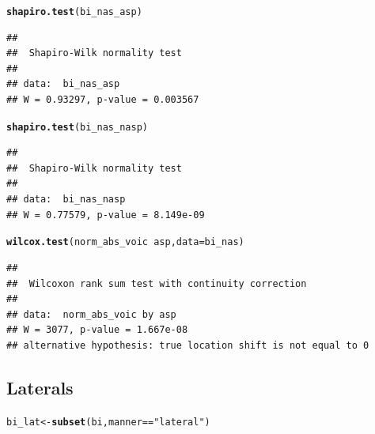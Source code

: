 \documentclass[a4paper,11pt]{article}\usepackage[]{graphicx}\usepackage[]{color}
\makeatletter
\newcommand{\hlstr}[1]{\textcolor[rgb]{0.192,0.494,0.8}{#1}}%
\newcommand{\hlopt}[1]{\textcolor[rgb]{0,0,0}{#1}}%
\newcommand{\hlstd}[1]{\textcolor[rgb]{0.345,0.345,0.345}{#1}}%
\newcommand{\hlkwb}[1]{\textcolor[rgb]{0.69,0.353,0.396}{#1}}%
\newcommand{\hlkwc}[1]{\textcolor[rgb]{0.333,0.667,0.333}{#1}}%
\newcommand{\hlkwd}[1]{\textcolor[rgb]{0.737,0.353,0.396}{\textbf{#1}}}%
\newenvironment{kframe}{%
 \def\at@end@of@kframe{}%
 \ifinner\ifhmode%
  \def\at@end@of@kframe{\end{minipage}}%
  \begin{minipage}{\columnwidth}%
 \fi\fi%
 \def\FrameCommand##1{\hskip\@totalleftmargin \hskip-\fboxsep
 \colorbox{shadecolor}{##1}\hskip-\fboxsep
     \hskip-\linewidth \hskip-\@totalleftmargin \hskip\columnwidth}%
 \MakeFramed {\advance\hsize-\width
   \@totalleftmargin\z@ \linewidth\hsize
   \@setminipage}}%
 {\par\unskip\endMakeFramed%
 \at@end@of@kframe}
\newenvironment{knitrout}{}{} %
\makeatother
\begin{document}
\begin{knitrout}
\color{fgcolor}\begin{kframe}
\begin{alltt}
\hlkwd{shapiro.test}\hlstd{(bi_nas_asp)}
\end{alltt}
\begin{verbatim}
## 
## 	Shapiro-Wilk normality test
## 
## data:  bi_nas_asp
## W = 0.93297, p-value = 0.003567
\end{verbatim}
\begin{alltt}
\hlkwd{shapiro.test}\hlstd{(bi_nas_nasp)}
\end{alltt}
\begin{verbatim}
## 
## 	Shapiro-Wilk normality test
## 
## data:  bi_nas_nasp
## W = 0.77579, p-value = 8.149e-09
\end{verbatim}
\begin{alltt}
\hlkwd{wilcox.test}\hlstd{(norm_abs_voic} \hlopt{~} \hlstd{asp,} \hlkwc{data} \hlstd{= bi_nas)}
\end{alltt}
\begin{verbatim}
## 
## 	Wilcoxon rank sum test with continuity correction
## 
## data:  norm_abs_voic by asp
## W = 3077, p-value = 1.667e-08
## alternative hypothesis: true location shift is not equal to 0
\end{verbatim}
\end{kframe}
\end{knitrout}

\subsection{Laterals}

\begin{knitrout}
\color{fgcolor}\begin{kframe}
\begin{alltt}
\hlstd{bi_lat} \hlkwb{<-} \hlkwd{subset}\hlstd{(bi, manner} \hlopt{==} \hlstr{"lateral"}\hlstd{)}
\end{alltt}
\end{kframe}
\end{knitrout}
\end{document}
